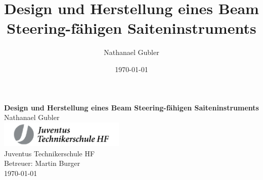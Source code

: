 \documentclass{report}
\title{Design und Herstellung eines Beam Steering-fähigen Saiteninstruments}
\author{Nathanael Gubler}
\date{\today}
\begin{document}
\begin{titlepage}
	\thispagestyle{empty} %
	\begin{center}
		 \vspace*{75pt} %
		
		{ \huge \textbf{Design und Herstellung eines Beam Steering-fähigen Saiteninstruments}} 			\\ [0.5cm]
		{\Large Nathanael Gubler} 	\\ [1.0cm]
		\includegraphics[width=6.0cm]{./pictures/JuventusLogo.pdf} 	\\ [0.5cm]
		{\large Juventus Technikerschule HF\\Betreuer: Martin Burger} 			\\ [0.5cm]
		{\large \today} 											\\ [1.0cm]
		\vspace*{-700pt}
		
	\end{center}
\end{titlepage}

\newpage
\setcounter{secnumdepth}{3} %
\setcounter{tocdepth}{3}    %
\setlength{\cftbeforetoctitleskip}{5pt} %
\setlength{\cftaftertoctitleskip}{15pt} %
\tableofcontents

\newpage
\setlength{\cftbeforeloftitleskip}{0pt} %
\setlength{\cftafterloftitleskip}{15pt} %
\listoffigures
{}  %

\newpage
\vspace{2mm}
\end{document}
